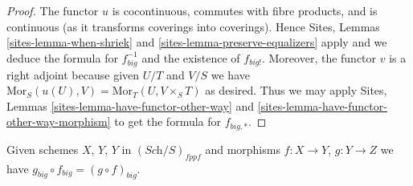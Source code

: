 \begin{proof}
The functor $u$ is cocontinuous, commutes with fibre products,
and is continuous (as it transforms coverings into coverings).
Hence Sites, Lemmas \ref{sites-lemma-when-shriek}
and \ref{sites-lemma-preserve-equalizers}
apply and we deduce the formula
for $f_{big}^{-1}$ and the existence of $f_{big!}$. Moreover,
the functor $v$ is a right adjoint because given $U/T$ and $V/S$
we have $\text{Mor}_S(u(U), V) = \text{Mor}_T(U, V\times_S T)$
as desired. Thus we may apply
Sites, Lemmas \ref{sites-lemma-have-functor-other-way} and
\ref{sites-lemma-have-functor-other-way-morphism} to get the
formula for $f_{big, *}$.
\end{proof}

\begin{lemma}
\label{lemma-composition-fppf}
Given schemes $X$, $Y$, $Y$ in $(\textit{Sch}/S)_{fppf}$
and morphisms $f : X \to Y$, $g : Y \to Z$ we have
$g_{big} \circ f_{big} = (g \circ f)_{big}$.
\end{lemma}

